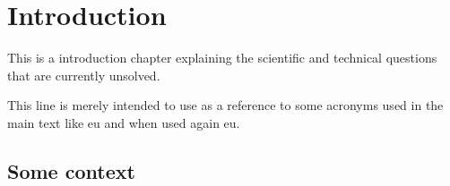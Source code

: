 %
%
%




\chapter{Introduction}\label{ch:Introduction}

This is a introduction chapter explaining the scientific and technical questions that are currently unsolved.

This line is merely intended to use as a reference to some acronyms used in the main text like \ac{eu} and when used again \ac{eu}.

\lipsum[1]

\section{Some context}
\lipsum[2-4]

